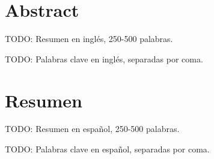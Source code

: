 \chapter*{Abstract}

\begin{abstractEn}
TODO: Resumen en inglés, 250-500 palabras.


\end{abstractEn}

\begin{keywordsEn}
TODO: Palabras clave en inglés, separadas por coma.
\end{keywordsEn}

\chapter*{Resumen}

\begin{abstractEs}
TODO: Resumen en español, 250-500 palabras.


\end{abstractEs}

\begin{keywordsEs}
TODO: Palabras clave en español, separadas por coma.
\end{keywordsEs}
